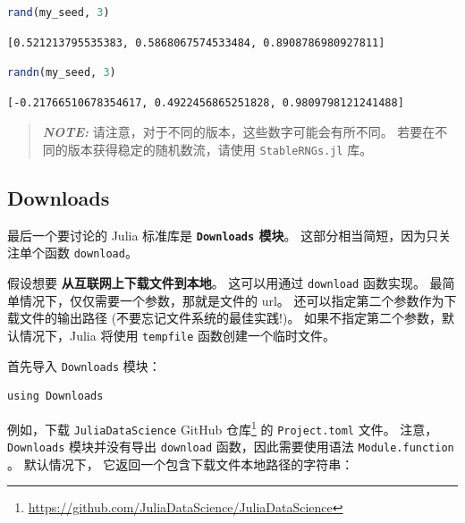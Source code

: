 \documentclass[
  notoc %
]{tufte-book}
\DeclareRobustCommand{\href}[2]{#2\footnote{\url{#1}}}
\newcommand{\passthrough}[1]{#1}
\begin{document}
\begin{lstlisting}[language=Julia]
rand(my_seed, 3)
\end{lstlisting}

\begin{lstlisting}[language=Output]
[0.521213795535383, 0.5868067574533484, 0.8908786980927811]
\end{lstlisting}

\begin{lstlisting}[language=Julia]
randn(my_seed, 3)
\end{lstlisting}

\begin{lstlisting}[language=Output]
[-0.21766510678354617, 0.4922456865251828, 0.9809798121241488]
\end{lstlisting}

\begin{quote}
\textbf{\emph{NOTE:}} 请注意，对于不同的版本，这些数字可能会有所不同。
若要在不同的版本获得稳定的随机数流，请使用
\passthrough{\lstinline!StableRNGs.jl!} 库。
\end{quote}

\hypertarget{sec:downloads}{%
\subsection{Downloads}\label{sec:downloads}}

最后一个要讨论的 Julia 标准库是
\textbf{\passthrough{\lstinline!Downloads!} 模块}。
这部分相当简短，因为只关注单个函数 \passthrough{\lstinline!download!}。

假设想要 \textbf{从互联网上下载文件到本地}。 这可以用通过
\passthrough{\lstinline!download!} 函数实现。
最简单情况下，仅仅需要一个参数，那就是文件的 url。
还可以指定第二个参数作为下载文件的输出路径
(不要忘记文件系统的最佳实践!)。 如果不指定第二个参数，默认情况下，Julia
将使用 \passthrough{\lstinline!tempfile!} 函数创建一个临时文件。

首先导入 \passthrough{\lstinline!Downloads!} 模块：

\begin{lstlisting}
using Downloads
\end{lstlisting}

例如，下载
\href{https://github.com/JuliaDataScience/JuliaDataScience}{\passthrough{\lstinline!JuliaDataScience!}
GitHub 仓库} 的 \passthrough{\lstinline!Project.toml!} 文件。
注意，\passthrough{\lstinline!Downloads!} 模块并没有导出
\passthrough{\lstinline!download!} 函数，因此需要使用语法
\passthrough{\lstinline!Module.function!} 。 默认情况下，
它返回一个包含下载文件本地路径的字符串：
\end{document}
